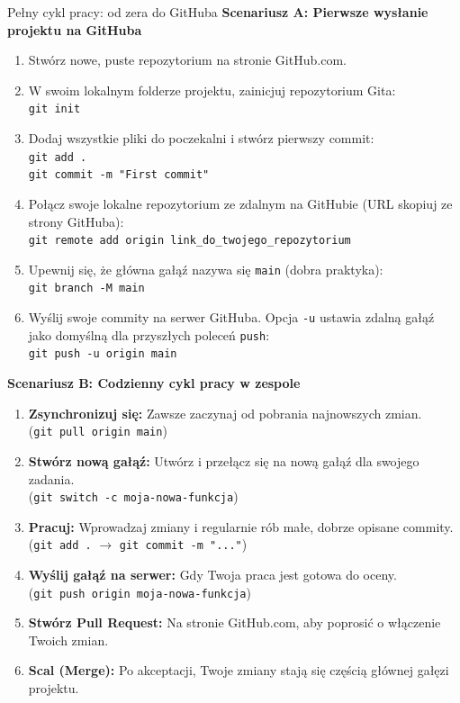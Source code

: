 \begin{importantbox}{Pełny cykl pracy: od zera do GitHuba}
\textbf{Scenariusz A: Pierwsze wysłanie projektu na GitHuba}
\begin{enumerate}
    \item Stwórz nowe, puste repozytorium na stronie GitHub.com.
    \item W swoim lokalnym folderze projektu, zainicjuj repozytorium Gita: \\
    \texttt{git init}
    \item Dodaj wszystkie pliki do poczekalni i stwórz pierwszy commit: \\
    \texttt{git add .} \\
    \texttt{git commit -m "First commit"}
    \item Połącz swoje lokalne repozytorium ze zdalnym na GitHubie (URL skopiuj ze strony GitHuba): \\
    \texttt{git remote add origin link\_do\_twojego\_repozytorium}
    \item Upewnij się, że główna gałąź nazywa się \texttt{main} (dobra praktyka): \\
    \texttt{git branch -M main}
    \item Wyślij swoje commity na serwer GitHuba. Opcja \texttt{-u} ustawia zdalną gałąź jako domyślną dla przyszłych poleceń \texttt{push}: \\
    \texttt{git push -u origin main}
\end{enumerate}

\vspace{1cm} %

\textbf{Scenariusz B: Codzienny cykl pracy w zespole}
\begin{enumerate}
    \item \textbf{Zsynchronizuj się:} Zawsze zaczynaj od pobrania najnowszych zmian. \\
    (\texttt{git pull origin main})
    \item \textbf{Stwórz nową gałąź:} Utwórz i przełącz się na nową gałąź dla swojego zadania. \\
    (\texttt{git switch -c moja-nowa-funkcja})
    \item \textbf{Pracuj:} Wprowadzaj zmiany i regularnie rób małe, dobrze opisane commity. \\
    (\texttt{git add .} $\rightarrow$ \texttt{git commit -m "..."})
    \item \textbf{Wyślij gałąź na serwer:} Gdy Twoja praca jest gotowa do oceny. \\
    (\texttt{git push origin moja-nowa-funkcja})
    \item \textbf{Stwórz Pull Request:} Na stronie GitHub.com, aby poprosić o włączenie Twoich zmian.
    \item \textbf{Scal (Merge):} Po akceptacji, Twoje zmiany stają się częścią głównej gałęzi projektu.
\end{enumerate}
\end{importantbox}
